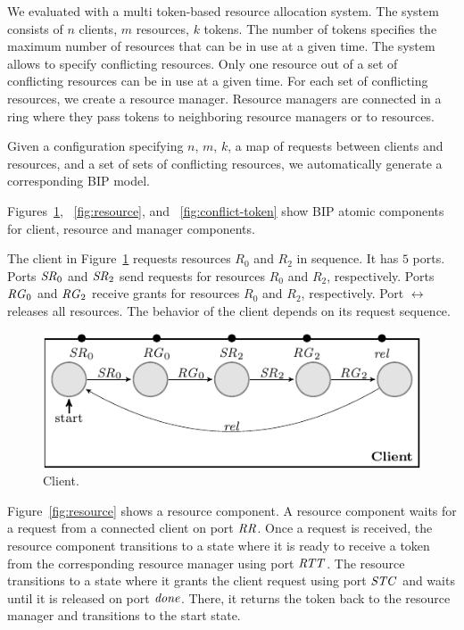 We evaluated \deadlocktool{} with a multi token-based resource allocation system. 
The system consists of $n$ clients, $m$ resources, $k$ tokens. 
The number of tokens specifies the maximum number of resources that
can be in use at a given time. 
The system allows to specify conflicting resources. 
Only one resource out of a set of conflicting resources can be in use at a given time.
For each set of conflicting resources, we create a resource manager.
Resource managers are connected in a ring where they pass tokens to neighboring resource managers or to resources. 

Given a configuration specifying $n$, $m$, $k$, a map of requests between clients and resources, and a set of sets of conflicting resources, 
we automatically generate a corresponding BIP model.

Figures~\ref{fig:client},
~\ref{fig:resource}, and
~\ref{fig:conflict-token}
show BIP atomic components for client, resource and manager components. 

The client in Figure~\ref{fig:client} requests resources $R_0$ and $R_2$ in sequence. It has $5$ ports. 
Ports $\mathit{SR}_0$ and $\mathit{SR}_2$ send requests for 
resources $R_0$ and $R_2$, respectively.
Ports $\mathit{RG}_0$ and $\mathit{RG}_2$ receive grants for 
resources $R_0$ and $R_2$, respectively.
Port $\rel$ releases all resources. 
The behavior of the client depends on its request sequence. 

\begin{figure}[H]
\begin{center}
\includegraphics[scale=1.2]{compiledfigures/client-crop.pdf}
\caption{Client.}
\label{fig:client}
\end{center}
\end{figure}

Figure~\ref{fig:resource} shows a resource component. 
A resource component waits for a request from a connected client on port $\mathit{RR}$. 
Once a request is received, the resource component transitions to a state where it is ready to 
receive a token from the corresponding resource manager using port $\mathit{RTT}$.
The resource transitions to a state where it grants the client request using port $\mathit{STC}$ and waits until it is released on port $\mathit{done}$. 
There, it returns the token back to the resource manager and transitions to the start state. 

